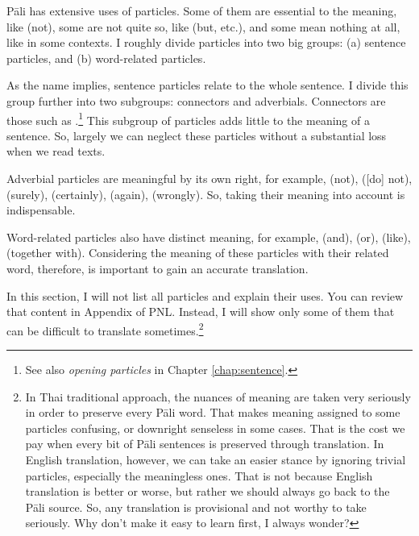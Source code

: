 P\=ali has extensive uses of particles. Some of them are essential to the meaning, like  (not), some are not quite so, like  (but, etc.), and some mean nothing at all, like  in some contexts. I roughly divide particles into two big groups: (a) sentence particles, and (b) word-related particles. 

As the name implies, sentence particles relate to the whole sentence. I divide this group further into two subgroups: connectors and adverbials. Connectors are those such as .\footnote{See also \emph{opening particles} in Chapter \ref{chap:sentence}.} This subgroup of particles adds little to the meaning of a sentence. So, largely we can neglect these particles without a substantial loss when we read texts.

Adverbial particles are meaningful by its own right, for example,  (not),  ([do] not),  (surely),  (certainly),  (again),  (wrongly). So, taking their meaning into account is indispensable.

Word-related particles also have distinct meaning, for example,  (and),  (or),  (like),  (together with). Considering the meaning of these particles with their related word, therefore, is important to gain an accurate translation.

In this section, I will not list all particles and explain their uses. You can review that content in Appendix  of PNL. Instead, I will show only some of them that can be difficult to translate sometimes.\footnote{In Thai traditional approach, the nuances of meaning are taken very seriously in order to preserve every P\=ali word. That makes meaning assigned to some particles confusing, or downright senseless in some cases. That is the cost we pay when every bit of P\=ali sentences is preserved through translation. In English translation, however, we can take an easier stance by ignoring trivial particles, especially the meaningless ones. That is not because English translation is better or worse, but rather we should always go back to the P\=ali source. So, any translation is provisional and not worthy to take seriously. Why don't make it easy to learn first, I always wonder?}

